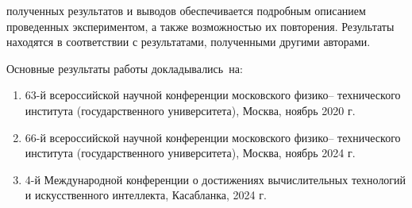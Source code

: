 {\reliability} полученных результатов и выводов обеспечивается подробным описанием проведенных экспериментом, а также возможностью их повторения. Результаты находятся в соответствии с результатами, полученными другими авторами.


{\probation}
Основные результаты работы докладывались~на:
\begin{enumerate}[beginpenalty=10000] %
	\item 63-й всероссийской научной конференции московского физико–
	технического института (государственного университета), Москва,
	ноябрь 2020 г.
	\item 66-й всероссийской научной конференции московского физико–
	технического института (государственного университета), Москва,
	ноябрь 2024 г.
	\item 4-й Международной конференции о достижениях вычислительных технологий и искусственного интеллекта, Касабланка, 2024 г.
\end{enumerate}

